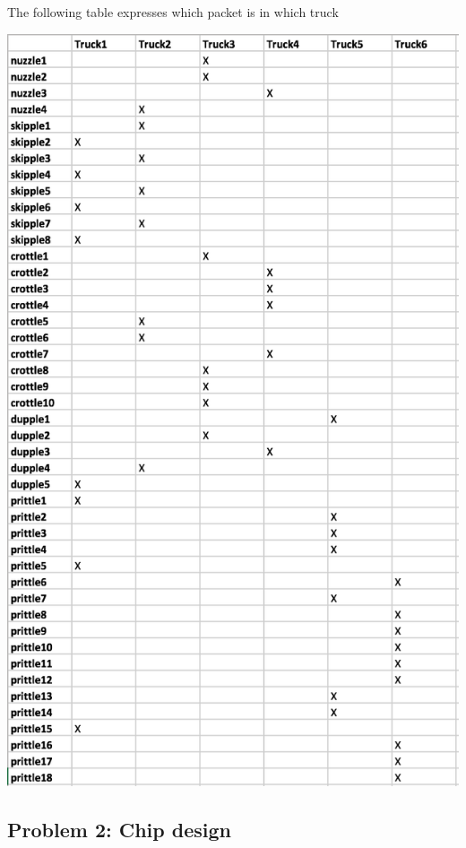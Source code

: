 \documentclass[12pt]{article}
\begin{document}
The following table expresses which packet is in which truck

\vspace{3mm}

\includegraphics[angle=0]{one.png}

\subsection{Problem 2: Chip design}
\end{document}

